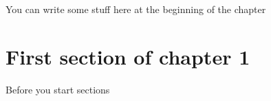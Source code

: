You can write some stuff here at the beginning of the chapter


\section{First section of chapter 1}

Before you start sections





